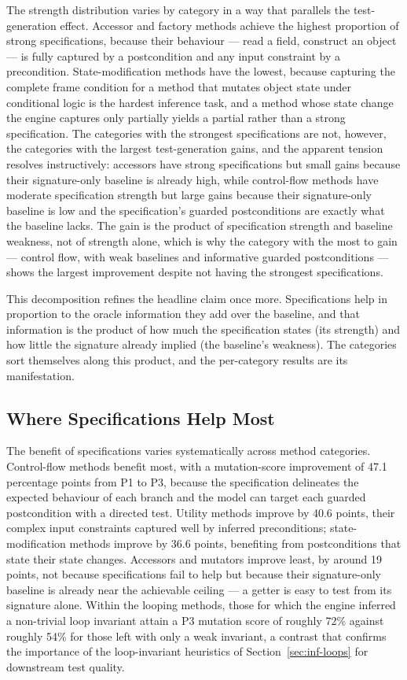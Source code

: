 The strength distribution varies by category in a way that parallels the
test-generation effect. Accessor and factory methods achieve the highest
proportion of strong specifications, because their behaviour --- read a field,
construct an object --- is fully captured by a postcondition and any input
constraint by a precondition. State-modification methods have the lowest, because
capturing the complete frame condition for a method that mutates object state under
conditional logic is the hardest inference task, and a method whose state change
the engine captures only partially yields a partial rather than a strong
specification. The categories with the strongest specifications are not, however,
the categories with the largest test-generation gains, and the apparent tension
resolves instructively: accessors have strong specifications but small gains
because their signature-only baseline is already high, while control-flow methods
have moderate specification strength but large gains because their signature-only
baseline is low and the specification's guarded postconditions are exactly what the
baseline lacks. The gain is the product of specification strength and baseline
weakness, not of strength alone, which is why the category with the most to gain ---
control flow, with weak baselines and informative guarded postconditions --- shows
the largest improvement despite not having the strongest specifications.

This decomposition refines the headline claim once more. Specifications help in
proportion to the oracle information they add over the baseline, and that
information is the product of how much the specification states (its strength) and
how little the signature already implied (the baseline's weakness). The categories
sort themselves along this product, and the per-category results are its
manifestation.

\subsection{Where Specifications Help Most}

The benefit of specifications varies systematically across method categories.
Control-flow methods benefit most, with a mutation-score improvement of 47.1
percentage points from P1 to P3, because the specification delineates the
expected behaviour of each branch and the model can target each guarded
postcondition with a directed test. Utility methods improve by 40.6 points,
their complex input constraints captured well by inferred preconditions; state-
modification methods improve by 36.6 points, benefiting from postconditions that
state their state changes. Accessors and mutators improve least, by around 19
points, not because specifications fail to help but because their signature-only
baseline is already near the achievable ceiling --- a getter is easy to test
from its signature alone. Within the looping methods, those for which the engine
inferred a non-trivial loop invariant attain a P3 mutation score of roughly 72\%
against roughly 54\% for those left with only a weak invariant, a contrast that
confirms the importance of the loop-invariant heuristics of
Section~\ref{sec:inf-loops} for downstream test quality.

